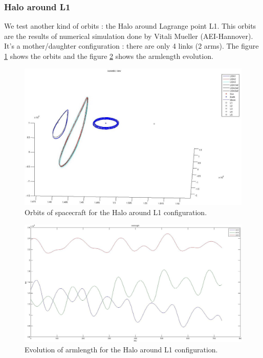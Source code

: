 \documentclass{iopart}
\begin{document}
\subsubsection{Halo around L1}
\label{SS:Inst:Orb:HL1}

We test another kind of orbits : the Halo around Lagrange point L1.
This orbits are the results of numerical simulation done by Vitali Mueller (AEI-Hannover).
It's a mother/daughter configuration : there are only 4 links (2 arms).
The figure \ref{F:HL1Orb} shows the orbits and the figure \ref{F:HL1Arm} shows the armlength evolution.

\begin{figure}
\begin{center}
\includegraphics[width=\textwidth, clip]{FigNoiseOrbSens/HL1isometric.jpg}
\end{center}
\caption{Orbits of spacecraft for the Halo around L1 configuration.
\label{F:HL1Orb} } 
\end{figure}

\begin{figure}
\begin{center}
\includegraphics[width=\textwidth, clip]{FigNoiseOrbSens/HL1armlength.jpg}
\end{center}
\caption{Evolution of armlength for the Halo around L1 configuration.
\label{F:HL1Arm} } 
\end{figure}
\end{document}
